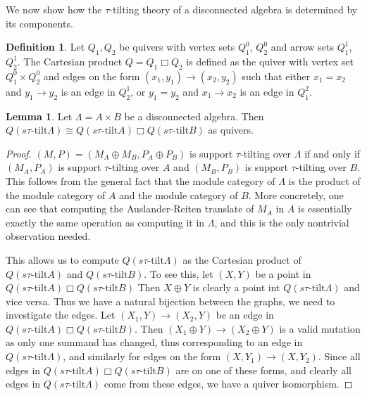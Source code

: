 \documentclass[]{article}
\theoremstyle{definition}
\newtheorem{definition}{Definition}[section]
\newtheorem{lemma}{Lemma}[section]
\newcommand{\tu}{\ensuremath{\tau}}
\begin{document}
We now show how the \tu-tilting theory of a disconnected algebra is determined by its components.

\begin{definition}
	Let $Q_1,Q_2$ be quivers with vertex sets $Q_1^0$, $Q_2^0$ and arrow sets $Q_1^1$, $Q_2^1$. The Cartesian product $Q = Q_1 \mathbin{\Box} Q_2$ is defined as the quiver with vertex set $Q_1^0 \times Q_2^0$ and edges on the form $(x_1,y_1) \to (x_2,y_2)$ such that either $x_1 = x_2$ and $y_1 \to y_2$ is an edge in $Q_2^1$, or $y_1 = y_2$ and $x_1 \to x_2$ is an edge in $Q_1^2$.
	\end{definition}

\begin{lemma}
	Let $\Lambda = A \times B$ be a disconnected algebra. Then $Q(s\tu\text{-tilt} \Lambda) \cong Q(s\tu\text{-tilt} A)\mathbin{\Box}Q(s\tu\text{-tilt} B)$ as quivers.
	\end{lemma}
\begin{proof}
$(M,P) = (M_A \oplus M_B,P_A \oplus P_B)$ is support \tu-tilting over $\Lambda$ if and only if $(M_A,P_A)$ is support \tu-tilting over $A$ and $(M_B,P_B)$ is support \tu-tilting over $B$. This follows from the general fact that the module category of $\Lambda$ is the product of the module category of $A$ and the module category of $B$. More concretely, one can see that computing the Auslander-Reiten translate of $M_A$ in $A$ is essentially exactly the same operation as computing it in $\Lambda$, and this is the only nontrivial observation needed.
	
This allows us to compute $Q(s\tu\text{-tilt} \Lambda)$ as the Cartesian product of $Q(s\tu\text{-tilt} A)$ and $Q(s\tu\text{-tilt} B)$. To see this, let $(X,Y)$ be a point in $Q(s\tu\text{-tilt} A) \mathbin{\Box} Q(s\tu\text{-tilt} B)$ Then $X \oplus Y$ is clearly a point int $Q(s\tu\text{-tilt} \Lambda) $ and vice versa. Thus we have a natural bijection between the graphs, we need to investigate the edges. Let $(X_1,Y) \to (X_2,Y)$ be an edge in $Q(s\tu\text{-tilt} A) \mathbin{\Box} Q(s\tu\text{-tilt} B)$.  Then $(X_1 \oplus Y) \to (X_2 \oplus Y)$ is a valid mutation as only one summand has changed, thus corresponding to an edge in $Q(s\tu\text{-tilt} \Lambda)$, and similarly for edges on the form $(X,Y_1) \to (X,Y_2)$. Since all edges in $Q(s\tu\text{-tilt} A)\mathbin{\Box}Q(s\tu\text{-tilt} B)$ are on one of these forms, and clearly all edges in $Q(s\tu\text{-tilt} \Lambda)$ come from these edges, we have a quiver isomorphism.
 	
\end{proof}
\end{document}
